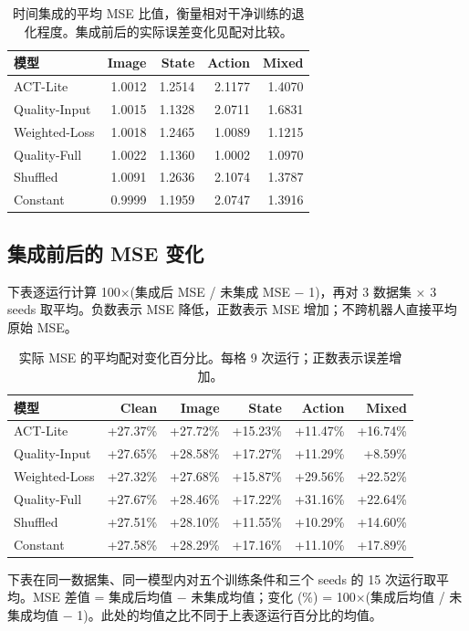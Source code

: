 \documentclass[11pt,a4paper]{ctexart}
\renewcommand{\arraystretch}{1.22}
\begin{document}
\begin{table}[H]\centering\small\begin{tabular}{lrrrr}\toprule
模型 & Image & State & Action & Mixed\\\midrule
ACT-Lite & 1.0012 & 1.2514 & 2.1177 & 1.4070\\
Quality-Input & 1.0015 & 1.1328 & 2.0711 & 1.6831\\
Weighted-Loss & 1.0018 & 1.2465 & 1.0089 & 1.1215\\
Quality-Full & 1.0022 & 1.1360 & 1.0002 & 1.0970\\
Shuffled & 1.0091 & 1.2636 & 2.1074 & 1.3787\\
Constant & 0.9999 & 1.1959 & 2.0747 & 1.3916\\
\bottomrule\end{tabular}\caption{时间集成的平均 MSE 比值，衡量相对干净训练的退化程度。集成前后的实际误差变化见配对比较。}\end{table}
\clearpage\subsection{集成前后的 MSE 变化}
\begingroup\small\renewcommand{\arraystretch}{1.08}\setlength{\intextsep}{8pt}
下表逐运行计算 100×(集成后 MSE / 未集成 MSE − 1)，再对 3 数据集 × 3 seeds 取平均。负数表示 MSE 降低，正数表示 MSE 增加；不跨机器人直接平均原始 MSE。
\begin{table}[H]\centering\small\begin{tabularx}{\linewidth}{Yrrrrr}\toprule
模型 & Clean & Image & State & Action & Mixed\\\midrule
ACT-Lite & +27.37\% & +27.72\% & +15.23\% & +11.47\% & +16.74\%\\
Quality-Input & +27.65\% & +28.58\% & +17.27\% & +11.29\% & +8.59\%\\
Weighted-Loss & +27.32\% & +27.68\% & +15.87\% & +29.56\% & +22.52\%\\
Quality-Full & +27.67\% & +28.46\% & +17.22\% & +31.16\% & +22.64\%\\
Shuffled & +27.51\% & +28.10\% & +11.55\% & +10.29\% & +14.60\%\\
Constant & +27.58\% & +28.29\% & +17.16\% & +11.10\% & +17.89\%\\
\bottomrule\end{tabularx}\caption{实际 MSE 的平均配对变化百分比。每格 9 次运行；正数表示误差增加。}\end{table}
下表在同一数据集、同一模型内对五个训练条件和三个 seeds 的 15 次运行取平均。MSE 差值 = 集成后均值 − 未集成均值；变化 (\%) = 100×(集成后均值 / 未集成均值 − 1)。此处的均值之比不同于上表逐运行百分比的均值。
\end{document}
